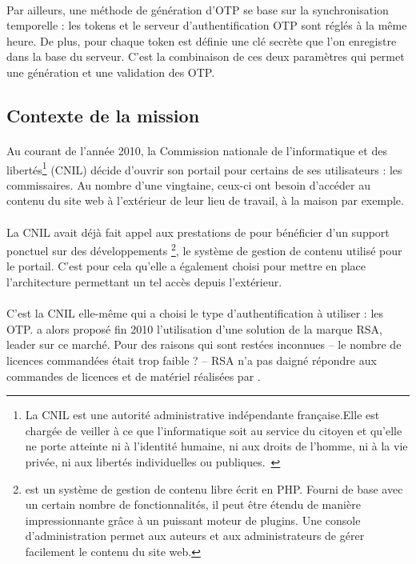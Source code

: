 \paragraph{}
Par ailleurs, une méthode de génération d'OTP se base sur la synchronisation temporelle : les tokens et le serveur d'authentification OTP sont réglés à la même heure.
De plus, pour chaque token est définie une clé secrète que l'on enregistre dans la base du serveur.
C'est la combinaison de ces deux paramètres qui permet une génération et une validation des OTP.


\subsection{Contexte de la mission}

\paragraph{}
Au courant de l'année 2010, la Commission nationale de l'informatique et des libertés\footnote{La CNIL est une autorité administrative indépendante française.Elle est chargée de veiller à ce que l'informatique soit au service du citoyen et qu'elle ne porte atteinte ni à l'identité humaine, ni aux droits de l'homme, ni à la vie privée, ni aux libertés individuelles ou publiques.~\cite{cnil}} (CNIL) décide d'ouvrir son portail \aintranet{} pour certains de ses utilisateurs : les commissaires.
Au nombre d'une vingtaine, ceux-ci ont besoin d'accéder au contenu du site web à l'extérieur de leur lieu de travail, à la maison par exemple.

\paragraph{}
La CNIL avait déjà fait appel aux prestations de \asmile{} pour bénéficier d'un support ponctuel sur des développements \atypo{}\footnote{\atypo{} est un système de gestion de contenu libre écrit en PHP. Fourni de base avec un certain nombre de fonctionnalités, il peut être étendu de manière impressionnante grâce à un puissant moteur de plugins. Une console d'administration permet aux auteurs et aux administrateurs de gérer facilement le contenu du site web.}, le système de gestion de contenu utilisé pour le portail.
C'est pour cela qu'elle a également choisi \asmile{} pour mettre en place l'architecture permettant un tel accès depuis l'extérieur.

\paragraph{}
C'est la CNIL elle-même qui a choisi le type d'authentification à utiliser : les OTP.
\asmile{} a alors proposé fin 2010 l'utilisation d'une solution de la marque RSA, leader sur ce marché.
Pour des raisons qui sont restées inconnues -- le nombre de licences commandées était trop faible ? -- RSA n'a pas daigné répondre aux commandes de licences et de matériel réalisées par \asmile.

